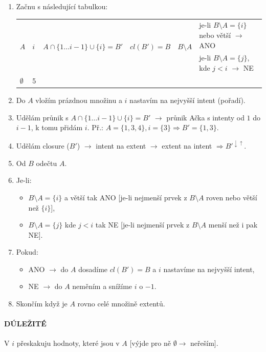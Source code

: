 \begin{enumerate}
\item Začnu s následující tabulkou:
\begin{table}[H]
	\centering
	\begin{tabular}{l|l|l|l|l|p{6cm}}
		\multirow{2}{*}{$ A $} & \multirow{2}{*}{$ i $} & \multirow{2}{*}{$ A \cap \{1 \ldots i - 1\} \cup \{i\} = B' $ } & \multirow{2}{*}{$ cl(B') = B $ } & \multirow{2}{*}{$B \setminus A $  } & je-li $B \setminus A = \{i\}$ nebo větší $\rightarrow$ ANO  \\
		&                   &                   &                   &                   & je-li $B \setminus A = \{j\}$, kde $j < i$ $\rightarrow$ NE \\\hhline
		$\emptyset$ & 5  &  &  &  & 
	\end{tabular}
\end{table}
\item Do $A$ vložím prázdnou množinu a $i$ nastavím na nejvyšší intent (pořadí).
\item Udělám průnik s $A \cap \{1 \ldots i - 1\} \cup \{i\} = B'$ $\rightarrow$ průnik Ačka s intenty od $ 1 $ do $ i-1 $, k tomu přidám $i$. Př.: $A = \{1, 3, 4\}, i = \{3\} \Rightarrow B' = \{1, 3\}$.
\item Udělám closure ($B'$) $\rightarrow$ intent na extent $\rightarrow$ extent na intent $\Rightarrow B'^{\downarrow \uparrow}$.
\item Od $B$ odečtu $A$.
\item Je-li:
\begin{itemize}
\item $B \setminus A = \{i\}$ a větší tak ANO [je-li nejmenší prvek z $B \setminus A$ roven nebo větší než $\{i\}$],
\item $B \setminus A = \{j\}$ kde $j < i$ tak NE [je-li nejmenší prvek z $B \setminus A$ menší než i pak NE].
\end{itemize}
\item Pokud:
\begin{itemize}
\item ANO $\rightarrow$ do $A$ dosadíme $cl(B') = B$ a $i$ nastavíme na nejvyšší intent,
\item NE $\rightarrow$ do $A$ neměním a snížíme $i$ o $-1$.
\end{itemize}
\item Skončím když je $A$ rovno celé množině extentů.
\end{enumerate}

\paragraph{DÚLEŽITÉ} V $i$ přeskakuju hodnoty, které jsou v $A$ [výjde pro ně $\emptyset \rightarrow$ neřeším].

